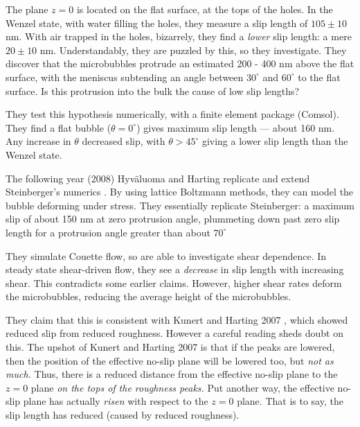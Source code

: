 \documentclass[a4paper]{report}
\begin{document}
The plane $z=0$ is located on the flat surface, at the tops of the holes.  In the Wenzel state, with water filling the holes, they measure a slip length of $105 \pm 10$ nm.  With air trapped in the holes, bizarrely, they find a \emph{lower} slip length: a mere $20 \pm 10$ nm.  Understandably, they are puzzled by this, so they investigate.  They discover that the microbubbles protrude an estimated 200 - 400 nm above the flat surface, with the meniscus subtending an angle between $30^{\circ}$ and $60^{\circ}$ to the flat surface.  Is this protrusion into the bulk the cause of low slip lengths?

They test this hypothesis numerically, with a finite element package (Comsol).  They find a flat bubble ($\theta = 0^{\circ}$) gives maximum slip length --- about 160 nm.  Any increase in $\theta$ decreased slip, with $\theta > 45^{\circ}$ giving a lower slip length than the Wenzel state.

The following year (2008) Hyv\"{a}luoma and Harting replicate and extend Steinberger's numerics \cite{HyvaluomaHarting2008}.  By using lattice Boltzmann methods, they can model the bubble deforming under stress.  They essentially replicate Steinberger: a maximum slip of about 150 nm at zero protrusion angle, plummeting down past zero slip length for a protrusion angle greater than about $70^{\circ}$

They simulate Couette flow, so are able to investigate shear dependence.  In steady state shear-driven flow, they see a \emph{decrease} in slip length with increasing shear.  This contradicts some earlier claims.  However, higher shear rates deform the microbubbles, reducing the average height of the microbubbles.

They claim that this is consistent with Kunert and Harting 2007 \cite{KunertHarting2007}, which showed reduced slip from reduced roughness.
However a careful reading sheds doubt on this. The upshot of Kunert and Harting 2007 \cite{KunertHarting2007} is that if the peaks are lowered, then the position of the effective no-slip plane will be lowered too, but \emph{not as much.}  Thus, there is a reduced distance from the effective no-slip plane to the $z=0$ plane \emph{on the tops of the roughness peaks.} Put another way, the effective no-slip plane has actually \emph{risen} with respect to the $z=0$ plane. That is to say, the slip length has reduced (caused by reduced roughness).  
\end{document}
